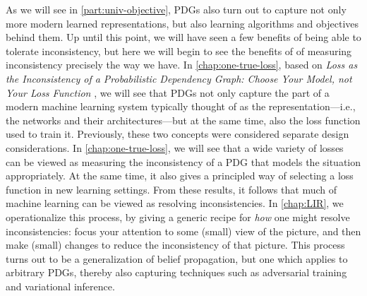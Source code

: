 {As we will see in \cref{part:univ-objective}, 
PDGs also turn out to capture not only more modern learned representations, 
    but also learning algorithms and objectives behind them. 
Up until this point, we will have seen a few benefits of being able to tolerate inconsistency, but here we will begin to see the benefits of of measuring inconsistency precisely the way we have. 
In \cref{chap:one-true-loss}, 
based on
\textit{Loss as the Inconsistency of a Probabilistic Dependency Graph: Choose Your Model, not Your Loss Function} \citep{one-true-loss}, 
we will see that PDGs not only capture the part of a modern machine learning system typically thought of as the representation---i.e., the networks and their architectures---but at the same time, also the loss function used to train it.  
Previously, these two concepts were considered separate design considerations. 
In \cref{chap:one-true-loss}, we will see that a wide variety of losses can be viewed as measuring the inconsistency of a PDG that models the situation appropriately. 
%
At the same time, it also gives a principled way of selecting a loss function in new learning settings. 
%
From these results, it follows that much of machine learning can be viewed as resolving inconsistencies. 
%
In \cref{chap:LIR}, we operationalize this process, by giving a generic recipe for \emph{how} one might resolve inconsistencies:
focus your attention to some (small) view of the picture, and then make (small) changes to reduce the inconsistency of that picture. 
%
This process turns out to be a generalization of {belief propagation}, but one which applies to arbitrary PDGs, thereby also capturing techniques such as adversarial training and variational inference. 



}
